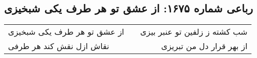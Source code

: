 \begin{center}
\section*{رباعی شماره ۱۶۷۵: از عشق تو هر طرف یکی شبخیزی}
\label{sec:1675}
\begin{longtable}{l p{0.5cm} r}
از عشق تو هر طرف یکی شبخیزی
&&
شب کشته ز زلفین تو عنبر بیزی
\\
نقاش ازل نقش کند هر طرفی
&&
از بهر قرار دل من تبریزی
\\
\end{longtable}
\end{center}
